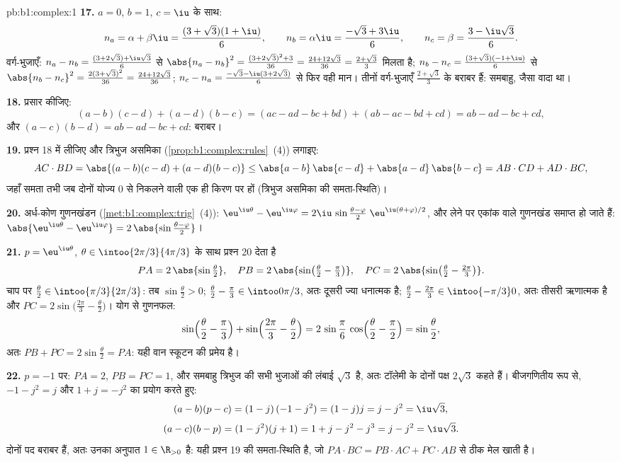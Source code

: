 \begin{solution}{pb:b1:complex:1}
\textbf{17.} $a = 0$, $b = 1$, $c = \iu$ के साथ:
\[
n_a = \alpha + \beta\iu = \frac{(3 + \sqrt3)(1 + \iu)}6,
\qquad
n_b = \alpha\iu = \frac{-\sqrt3 + 3\iu}6,
\qquad
n_c = \beta = \frac{3 - \iu\sqrt3}6 .
\]
वर्ग-भुजाएँ: $n_a - n_b = \frac{(3 + 2\sqrt3) + \iu\sqrt3}6$ से $\abs{n_a -
n_b}^2 = \frac{(3 + 2\sqrt3)^2 + 3}{36} = \frac{24 + 12\sqrt3}{36} = \frac{2
+ \sqrt3}3$ मिलता है; $n_b - n_c = \frac{(3 + \sqrt3)(-1 + \iu)}6$ से
$\abs{n_b - n_c}^2 = \frac{2(3 + \sqrt3)^2}{36} = \frac{24 + 12\sqrt3}{36}$;
$n_c - n_a = \frac{-\sqrt3 - \iu(3 + 2\sqrt3)}6$ से फिर वही मान। तीनों
वर्ग-भुजाएँ $\frac{2 + \sqrt3}3$ के बराबर हैं: समबाहु, जैसा वादा था।

\textbf{18.} प्रसार कीजिए:
\[
(a - b)(c - d) + (a - d)(b - c)
= (ac - ad - bc + bd) + (ab - ac - bd + cd)
= ab - ad - bc + cd ,
\]
और $(a - c)(b - d) = ab - ad - bc + cd$: बराबर।

\textbf{19.} प्रश्न 18 में  लीजिए और त्रिभुज असमिका
(\cref{prop:b1:complex:rules}~(4)) लगाइए:
\[
AC \cdot BD = \abs{(a-b)(c-d) + (a-d)(b-c)}
\leq \abs{a-b}\,\abs{c-d} + \abs{a-d}\,\abs{b-c}
= AB \cdot CD + AD \cdot BC ,
\]
जहाँ समता तभी जब दोनों योज्य $0$ से निकलने वाली एक ही किरण पर हों (त्रिभुज
असमिका की समता-स्थिति)।

\textbf{20.} अर्ध-कोण गुणनखंडन (\cref{met:b1:complex:trig}~(4)):
$\eu^{\iu\theta} - \eu^{\iu\varphi} = 2\iu\,\sin\frac{\theta -
\varphi}2\;\eu^{\iu(\theta + \varphi)/2}$, और  लेने पर एकांक 
वाले गुणनखंड समाप्त हो जाते हैं: $\abs{\eu^{\iu\theta} - \eu^{\iu\varphi}} =
2\,\abs{\sin\frac{\theta - \varphi}2}$।

\textbf{21.} $p = \eu^{\iu\theta}$, $\theta \in \intoo{2\pi/3}{4\pi/3}$ के
साथ प्रश्न 20 देता है
\[
PA = 2\,\abs{\sin\tfrac\theta2},
\quad
PB = 2\,\abs{\sin\bigl(\tfrac\theta2 - \tfrac\pi3\bigr)},
\quad
PC = 2\,\abs{\sin\bigl(\tfrac\theta2 - \tfrac{2\pi}3\bigr)} .
\]
चाप पर $\frac\theta2 \in \intoo{\pi/3}{2\pi/3}$: तब $\sin\frac\theta2 > 0$;
$\frac\theta2 - \frac\pi3 \in \intoo0{\pi/3}$, अतः दूसरी ज्या धनात्मक है;
$\frac\theta2 - \frac{2\pi}3 \in \intoo{-\pi/3}0$, अतः तीसरी ऋणात्मक है और
$PC = 2\sin\bigl(\frac{2\pi}3 - \frac\theta2\bigr)$। योग से गुणनफल:
\[
\sin\Bigl(\frac\theta2 - \frac\pi3\Bigr) +
\sin\Bigl(\frac{2\pi}3 - \frac\theta2\Bigr)
= 2\,\sin\frac\pi6\,\cos\Bigl(\frac\theta2 - \frac\pi2\Bigr)
= \sin\frac\theta2 ,
\]
अतः $PB + PC = 2\sin\frac\theta2 = PA$: यही वान स्कूटन की प्रमेय है।

\textbf{22.} $p = -1$ पर: $PA = 2$, $PB = PC = 1$, और समबाहु त्रिभुज की सभी
भुजाओं की लंबाई $\sqrt3$ है, अतः टॉलेमी के दोनों पक्ष $2\sqrt3$ कहते हैं।
बीजगणितीय रूप से, $-1 - j^2 = j$ और $1 + j = -j^2$ का प्रयोग करते हुए:
\[
(a - b)(p - c) = (1 - j)\,(-1 - j^2) = (1 - j)j = j - j^2
= \iu\sqrt3 ,
\]
\[
(a - c)(b - p) = (1 - j^2)(j + 1) = 1 + j - j^2 - j^3
= j - j^2 = \iu\sqrt3 .
\]
दोनों पद बराबर हैं, अतः उनका अनुपात $1 \in \R_{>0}$ है: यही प्रश्न 19 की
समता-स्थिति है, जो $PA \cdot BC = PB \cdot AC + PC \cdot AB$ से ठीक मेल खाती
है।


\end{solution}
